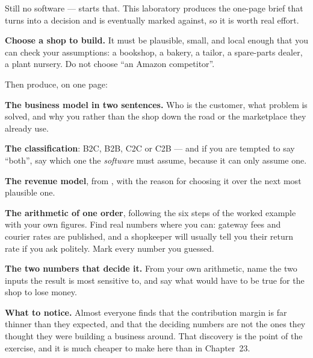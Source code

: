 \begin{lab}
Still no software ---  starts that. This laboratory produces the
one-page brief that  turns into a decision and
 is eventually marked against, so it is worth real effort.

\smallskip
\textbf{Choose a shop to build.} It must be plausible, small, and local enough
that you can check your assumptions: a bookshop, a bakery, a tailor, a
spare-parts dealer, a plant nursery. Do not choose ``an Amazon competitor''.

\smallskip
Then produce, on one page:

\begin{tightnum}
  \item \textbf{The business model in two sentences.} Who is the customer, what
        problem is solved, and why you rather than the shop down the road or
        the marketplace they already use.
  \item \textbf{The classification}: B2C, B2B, C2C or C2B --- and if you are
        tempted to say ``both'', say which one the \emph{software} must assume,
        because it can only assume one.
  \item \textbf{The revenue model}, from , with the reason
        for choosing it over the next most plausible one.
  \item \textbf{The arithmetic of one order}, following the six steps of the
        worked example with your own figures. Find real numbers where you can:
        gateway fees and courier rates are published, and a shopkeeper will
        usually tell you their return rate if you ask politely. Mark every
        number you guessed.
  \item \textbf{The two numbers that decide it.} From your own arithmetic, name
        the two inputs the result is most sensitive to, and say what would have
        to be true for the shop to lose money.
\end{tightnum}

\smallskip
\textbf{What to notice.} Almost everyone finds that the contribution margin is
far thinner than they expected, and that the deciding numbers are not the ones
they thought they were building a business around. That discovery is the point
of the exercise, and it is much cheaper to make here than in Chapter~23.
\end{lab}

